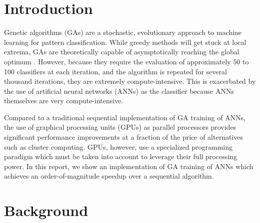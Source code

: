 \documentclass[11pt]{article}       %
\begin{document}
\section{Introduction} \label{intro}
Genetic algorithms (GAs) are a stochastic, evolutionary approach to machine learning for pattern classification. While greedy methods will get stuck at local extrema, GAs  are theoretically capable of asymptotically reaching the global optimum \cite{GA-ANN}. However, because they require the evaluation of approximately 50 to 100 classifiers at each iteration, and the algorithm is repeated for several thousand iterations, they are extremely compute-intensive. This is exacerbated by the use of artificial neural networks (ANNs) as the classifier because ANNs themselves are very compute-intensive.

Compared to a traditional sequential implementation of GA training of ANNs, the use of graphical processing units (GPUs) as parallel processors provides significant performance improvements at a fraction of the price of alternatives such as cluster computing. GPUs, however, use a specialized programming paradigm which must be taken into account to leverage their full processing power. In this report, we show an implementation of GA training of ANNs which achieves an order-of-magnitude speedup over a sequential algorithm.

\section{Background} \label{background}

\end{document}
